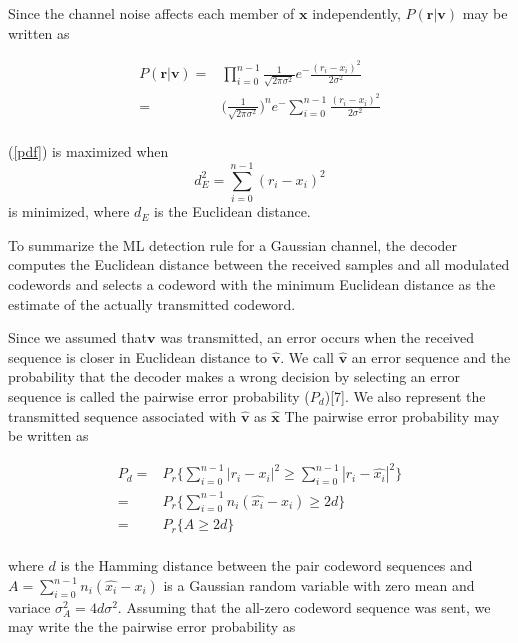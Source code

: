 \documentclass[20 pts]{article}
\begin{document}
    Since the channel noise affects each member of $\mathbf{x}$ independently,
    $P(\mathbf{r}|\mathbf{v})$ may be written as
    
    \begin{equation}
    \begin{split}
    P(\mathbf{r}|\mathbf{v})=&\prod_{i=0}^{n-1}\frac{1}{\sqrt{2\pi\sigma^2}}
    e^-\frac{(r_i-x_i)^2}{2\sigma^2}\\
    =&\Big( \frac{1}{\sqrt{2\pi\sigma^2}}\Big)^n
    e^-\sum_{i=0}^{n-1}\frac{(r_i-x_i)^2}{2\sigma^2}\\
    \end{split}
    \label{pdf}
    \end{equation}
     
     (\ref{pdf}) is maximized when $$ d^2_E =\sum_{i=0}^{n-1} (r_i - x_i)^2$$ is 
     minimized, where $d_E$ is the Euclidean distance. 
     
     To summarize the ML detection rule for a Gaussian channel, the decoder computes
     the Euclidean distance between the received samples and all modulated codewords
     and selects a codeword with the minimum Euclidean distance as the estimate of
     the actually transmitted codeword. 
     
     Since we assumed that$\mathbf{v}$
     was transmitted, an error occurs when the 
     received sequence is closer in Euclidean distance to $\hat{\mathbf{v}}$. We call
     $\hat{\mathbf{v}}$ an error sequence and the probability that the decoder makes
     a wrong decision by selecting an error sequence is called the pairwise error 
     probability ($P_d$)[7]. We also represent the transmitted sequence associated with 
     $\hat{\mathbf{v}}$ as $\hat{\mathbf{x}}$
     The pairwise error probability may be written as 
     
     \begin{equation}
    \begin{split}
    P_d=&P_r \Big\{\sum_{i=0}^{n-1} | r_i-x_i |^2  
\geq  \sum_{i=0}^{n-1} | r_i-\hat{x_i} |^2  \Big\}\\
    =&P_r\Big\{\sum_{i=0}^{n-1} n_i( \hat{x_i}-x_i )  
    \geq 2d \Big\}\\
    =&P_r\Big\{A \geq 2d \Big\}\\
    \end{split}
    \label{pd}
    \end{equation}
     
     where $d$ is the Hamming distance between the pair codeword sequences and 
     $A=\sum_{i=0}^{n-1} n_i( \hat{x_i}-x_i )$
     is a Gaussian random variable with zero mean and variace $\sigma_A^2 =4d
     \sigma^2$. Assuming that the all-zero codeword sequence was sent,
      we may write the the pairwise error probability as
     
\end{document}
